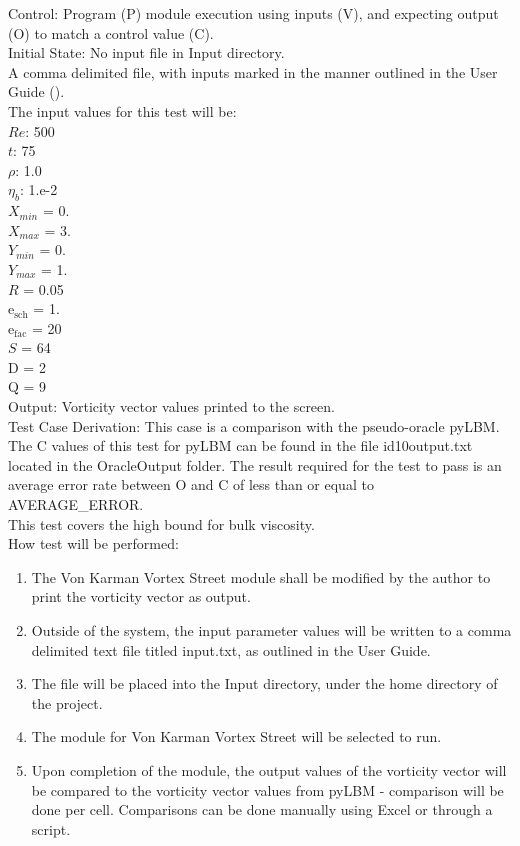 \documentclass[12pt, titlepage]{article}
\begin{document}
\begin{enumerate}
Control: Program (P) module execution using inputs (V), and expecting output (O) to match a control value (C).\\
					
Initial State: No input file in Input directory.\\
					
A comma delimited file, with inputs marked in the manner outlined in the User
Guide (\citet{LBM_UserGuide_PM}).\\The input values for this test will be:\\
$Re$: 500\\
$t$: 75\\
$\rho$: 1.0\\
$\eta_b$: 1.e-2\\
$X_{min}$ = 0.\\
$X_{max}$ = 3.\\
$Y_{min}$ = 0.\\
$Y_{max}$ = 1.\\
$R$ = 0.05\\
$\mathrm{e_{sch}}$ = 1.\\
$\mathrm{e_{fac}}$ = 20\\
$S$ = 64\\
$\mathrm{D}$ = 2\\
$\mathrm{Q}$ = 9\\

Output: Vorticity vector values printed to the screen. \\ 

Test Case Derivation: This case is a comparison with the pseudo-oracle
pyLBM. The C values of this test for pyLBM can be found in the file
id10output.txt located in the OracleOutput folder. The result required for the
test to pass is an average error rate between O and C of less than or equal to
AVERAGE\_ERROR.\\

This test covers the high bound for bulk viscosity.\\
					
How test will be performed: 

\begin{enumerate}
\item The Von Karman Vortex Street module shall be modified by the author to
  print the vorticity vector as output.
\item Outside of the system, the input parameter values will be written to a
  comma delimited text file titled input.txt, as outlined in the User Guide.
\item The file will be placed into the Input directory, under the home directory
of the project.
\item The module for Von Karman Vortex Street will be selected to run.
\item Upon completion of the module, the output values of the vorticity vector
will be compared to the vorticity vector values from pyLBM - comparison will be
done per cell. Comparisons can be done manually using Excel or through a
script.\\
\end{enumerate}

\end{enumerate}
~\newpage
\end{document}
